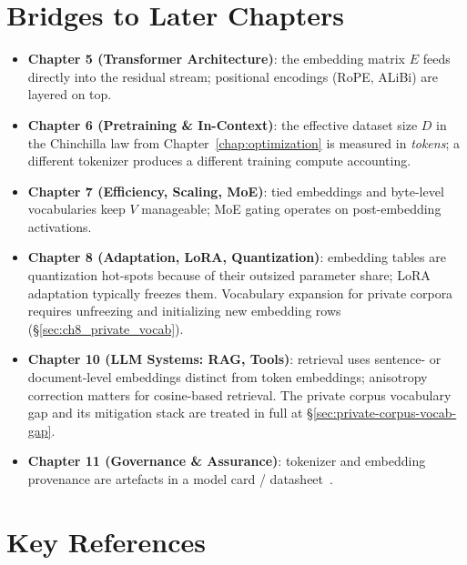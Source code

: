 \section{Bridges to Later Chapters}

\begin{itemize}
  \item \textbf{Chapter 5 (Transformer Architecture)}: the embedding
        matrix $E$ feeds directly into the residual stream; positional
        encodings (RoPE, ALiBi) are layered on top.
  \item \textbf{Chapter 6 (Pretraining \& In-Context)}: the effective
        dataset size $D$ in the Chinchilla law from Chapter~\ref{chap:optimization} is measured
        in \emph{tokens}; a different tokenizer produces a different
        training compute accounting.
  \item \textbf{Chapter 7 (Efficiency, Scaling, MoE)}: tied embeddings
        and byte-level vocabularies keep $V$ manageable; MoE gating
        operates on post-embedding activations.
  \item \textbf{Chapter 8 (Adaptation, LoRA, Quantization)}: embedding
        tables are quantization hot-spots because of their outsized
        parameter share; LoRA adaptation typically freezes them.
        Vocabulary expansion for private corpora requires unfreezing
        and initializing new embedding rows
        (\S\ref{sec:ch8_private_vocab}).
  \item \textbf{Chapter 10 (LLM Systems: RAG, Tools)}: retrieval uses
        sentence- or document-level embeddings distinct from token
        embeddings; anisotropy correction matters for cosine-based
        retrieval. The private corpus vocabulary gap and its
        mitigation stack are treated in full at
        \S\ref{sec:private-corpus-vocab-gap}.
  \item \textbf{Chapter 11 (Governance \& Assurance)}: tokenizer and
        embedding provenance are artefacts in a model card /
        datasheet~\citep{mitchell2019modelcards,gebru2021datasheets}.
\end{itemize}

\section{Key References}

